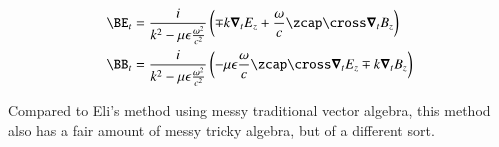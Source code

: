 \begin{align}\label{eqn:transversePair}
\BE_t &= \frac{i}{k^2 - \mu\epsilon\frac{\omega^2}{c^2}} \left( \mp k \spacegrad_t E_z + \frac{\omega}{c} \zcap \cross \spacegrad_t B_z \right) \\
\BB_t &= \frac{i}{k^2 - \mu\epsilon\frac{\omega^2}{c^2}} \left( - {\mu\epsilon}\frac{\omega}{c} \zcap \cross \spacegrad_t E_z \mp k \spacegrad_t B_z \right) 
\end{align}

Compared to Eli's method using messy traditional vector algebra, this method also has a fair amount of messy tricky algebra, but of a different sort.

\EndNoBibArticle
